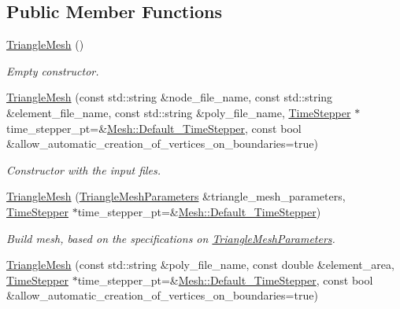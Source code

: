 \subsection*{Public Member Functions}
\begin{DoxyCompactItemize}
\item 
\hyperlink{classoomph_1_1TriangleMesh_aec6b165889c9e65820d74837c237b7c7}{Triangle\+Mesh} ()
\begin{DoxyCompactList}\small\item\em Empty constructor. \end{DoxyCompactList}\item 
\hyperlink{classoomph_1_1TriangleMesh_acb4a658f29866da64cfd31daa98827dc}{Triangle\+Mesh} (const std\+::string \&node\+\_\+file\+\_\+name, const std\+::string \&element\+\_\+file\+\_\+name, const std\+::string \&poly\+\_\+file\+\_\+name, \hyperlink{classoomph_1_1TimeStepper}{Time\+Stepper} $\ast$time\+\_\+stepper\+\_\+pt=\&\hyperlink{classoomph_1_1Mesh_a12243d0fee2b1fcee729ee5a4777ea10}{Mesh\+::\+Default\+\_\+\+Time\+Stepper}, const bool \&allow\+\_\+automatic\+\_\+creation\+\_\+of\+\_\+vertices\+\_\+on\+\_\+boundaries=true)
\begin{DoxyCompactList}\small\item\em Constructor with the input files. \end{DoxyCompactList}\item 
\hyperlink{classoomph_1_1TriangleMesh_a9178e41a6f4af03bbb6b304ac3c201aa}{Triangle\+Mesh} (\hyperlink{classoomph_1_1TriangleMeshParameters}{Triangle\+Mesh\+Parameters} \&triangle\+\_\+mesh\+\_\+parameters, \hyperlink{classoomph_1_1TimeStepper}{Time\+Stepper} $\ast$time\+\_\+stepper\+\_\+pt=\&\hyperlink{classoomph_1_1Mesh_a12243d0fee2b1fcee729ee5a4777ea10}{Mesh\+::\+Default\+\_\+\+Time\+Stepper})
\begin{DoxyCompactList}\small\item\em Build mesh, based on the specifications on \hyperlink{classoomph_1_1TriangleMeshParameters}{Triangle\+Mesh\+Parameters}. \end{DoxyCompactList}\item 
\hyperlink{classoomph_1_1TriangleMesh_aa0346dc3c88395c949f2e2c0209aea39}{Triangle\+Mesh} (const std\+::string \&poly\+\_\+file\+\_\+name, const double \&element\+\_\+area, \hyperlink{classoomph_1_1TimeStepper}{Time\+Stepper} $\ast$time\+\_\+stepper\+\_\+pt=\&\hyperlink{classoomph_1_1Mesh_a12243d0fee2b1fcee729ee5a4777ea10}{Mesh\+::\+Default\+\_\+\+Time\+Stepper}, const bool \&allow\+\_\+automatic\+\_\+creation\+\_\+of\+\_\+vertices\+\_\+on\+\_\+boundaries=true)

\end{DoxyCompactItemize}
